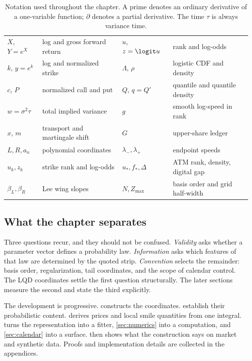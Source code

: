 \begin{table}[htbp]
\centering\small
\setlength{\tabcolsep}{4pt}
\begin{tabular}{@{}llll@{}}
\toprule
$X$, $Y=e^X$ & log and gross forward return &
$u$, $z=\logit u$ & rank and log-odds\\
$k$, $y=e^k$ & log and normalized strike &
$\Lambda$, $\rho$ & logistic CDF and density\\
$c$, $P$ & normalized call and put &
$Q$, $q=Q'$ & quantile and quantile density\\
$w=\sigma^2\tau$ & total implied variance &
$g$ & smooth log-speed in rank\\
$x$, $m$ & transport and martingale shift &
$G$ & upper-share ledger\\
$L,R,a_n$ & polynomial coordinates &
$\lambda_-,\lambda_+$ & endpoint speeds\\
$u_k,z_k$ & strike rank and log-odds &
$u_*,f_*,\Delta$ & ATM rank, density, digital gap\\
$\beta_L,\beta_R$ & Lee wing slopes &
$N,Z_{\max}$ & basis order and grid half-width\\
\bottomrule
\end{tabular}
\caption{Notation used throughout the chapter.  A prime denotes an ordinary
derivative of a one-variable function; $\partial$ denotes a partial
derivative.  The time $\tau$ is always variance time.}
\label{tab:notation}
\end{table}

\subsection{What the chapter separates}

Three questions recur, and they should not be confused.  \emph{Validity} asks
whether a parameter vector defines a probability law.  \emph{Information}
asks which features of that law are determined by the quoted strip.
\emph{Convention} selects the remainder: basis order, regularization, tail
coordinates, and the scope of calendar control.  The LQD coordinates settle
the first question structurally.  The later sections measure the second and
state the third explicitly.

The development is progressive.   constructs the coordinates.
 establish their probabilistic content.
 derives prices and local smile quantities from one integral.
 turns the representation into a fitter,
\cref{sec:numerics} into a computation, and \cref{sec:calendar} into a
surface.   then shows what the construction says on market
and synthetic data.  Proofs and implementation details are collected in the
appendices.
